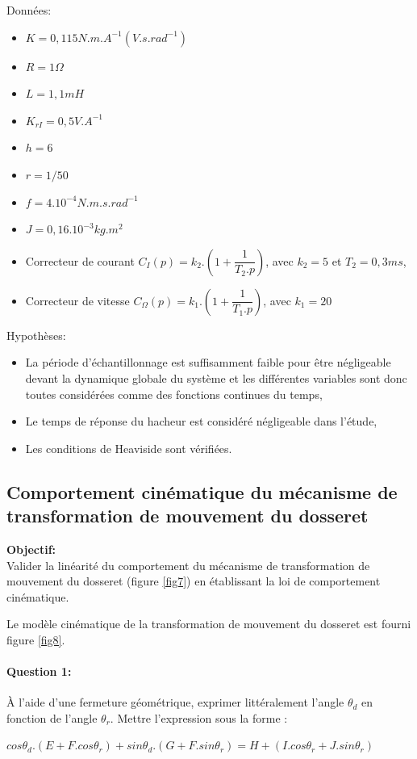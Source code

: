 Données: \\
\begin{itemize}
 \item $K = 0,115 N.m.A^{-1}(V.s.rad^{-1})$
 \item $R = 1 \Omega$
 \item $L = 1,1mH$
 \item $K_{rI}= 0,5 V. A^{-1}$
 \item $h = 6$
 \item $r = 1/50$
 \item $f = 4.10^{-4} N.m.s.rad^{-1}$
 \item $J=0,16.10^{-3} kg.m^2$
 \item Correcteur de courant $C_I(p)=k_2.(1+\dfrac{1}{T_2.p})$, avec $k_2 = 5$ et $T_2=0,3ms$,
 \item Correcteur de vitesse $C_{\Omega}(p)=k_1.(1+\dfrac{1}{T_1.p})$, avec $k_1=20$
\end{itemize}

Hypothèses: \\
\begin{itemize}
 \item La période d'échantillonnage est suffisamment faible pour être négligeable devant la dynamique globale du système et les différentes variables sont donc toutes considérées comme des fonctions continues du temps,
 \item Le temps de réponse du hacheur est considéré négligeable dans l'étude,
 \item Les conditions de Heaviside sont vérifiées.
\end{itemize}

\subsection{Comportement cinématique du mécanisme de transformation de mouvement du dosseret}

\textbf{Objectif:}\\
Valider la linéarité du comportement du mécanisme de transformation de mouvement du dosseret (figure \ref{fig7}) en établissant la loi de comportement cinématique.

Le modèle cinématique de la transformation de mouvement du dosseret est fourni figure \ref{fig8}.

\paragraph{Question 1:} À l'aide d'une fermeture géométrique, exprimer littéralement l'angle $\theta_d$ en fonction de l'angle $\theta_r$. Mettre l'expression sous la forme :
\begin{center}
$cos\theta_d.(E+F.cos\theta_r)+sin\theta_d.(G+F.sin\theta_r)=H+(I.cos\theta_r+J.sin\theta_r)$
\end{center}

